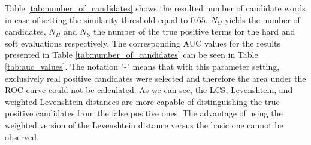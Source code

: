 Table \ref{tab:number_of_candidates} shows the resulted number of candidate words in case of setting the similarity threshold equal to $0.65$. $N_C$ yields the number of candidates, $N_H$ and $N_S$ the number of the true positive terms for the hard and soft evaluations respectively. The corresponding AUC values for the results presented in Table \ref{tab:number_of_candidates} can be seen in Table \ref{tab:auc_values}. The notation "-" means that with this parameter setting, exclusively real positive candidates were selected and therefore the area under the ROC curve could not be calculated. As we can see, the LCS, Levenshtein, and weighted Levenshtein distances are more capable of distinguishing the true positive candidates from the false positive ones. The advantage of using the weighted version of the Levenshtein distance versus the basic one cannot be observed.

